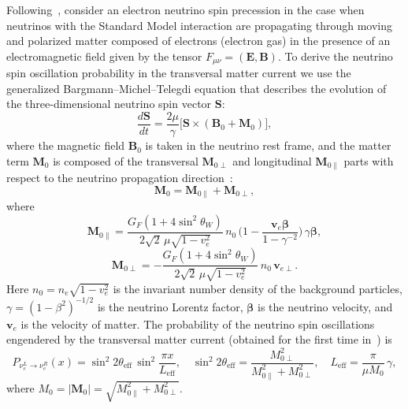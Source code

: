 \documentclass[a4paper,11pt]{article}
\begin{document}
Following~\cite{Studenikin:2004PAN,Studenikin:2019arXiv}, consider an electron neutrino spin precession in the case when neutrinos with the Standard Model interaction are propagating through moving and polarized matter composed of electrons (electron gas) in the presence of an electromagnetic field given by the tensor $F_{\mu\nu} = (\mathbf{E}, \mathbf{B})$. To derive the neutrino spin oscillation probability in the transversal matter current we use the generalized Bargmann--Michel--Telegdi equation that describes the evolution of the three-dimensional neutrino spin vector $\mathbf{S}$:
\begin{equation}
\label{eq:BMT}
\frac{d\mathbf{S}}{dt} = \frac{2\mu}{\gamma}\Big[\mathbf{S} \times (\mathbf{B}_0 + \mathbf{M}_0)\Big],
\end{equation}
where the magnetic field $\mathbf{B}_0$ is taken in the neutrino rest frame, and the matter term $\mathbf{M}_0$ is composed of the transversal $\mathbf{M}_{0\perp}$ and longitudinal $\mathbf{M}_{0\parallel}$ parts with respect to the neutrino propagation direction~\cite{Studenikin:2004PAN,Studenikin:2019arXiv}:
\begin{equation}
\label{eq:M0}
\mathbf{M}_0 = \mathbf{M}_{0\parallel} + \mathbf{M}_{0\perp},
\end{equation}
where
\begin{equation}
\label{eq:M0_par}
\mathbf{M}_{0\parallel} = \frac{G_F(1 + 4\sin^2\theta_W)}{2\sqrt{2}\,\mu\sqrt{1-v_e^2}}\,n_0\,\Big(1 - \frac{\mathbf{v}_e\boldsymbol{\beta}}{1-\gamma^{-2}}\Big)\,\gamma\boldsymbol{\beta},
\end{equation}
\begin{equation}
\label{eq:M0_perp}
\mathbf{M}_{0\perp} = -\frac{G_F(1 + 4\sin^2\theta_W)}{2\sqrt{2}\,\mu\sqrt{1-v_e^2}}\,n_0\,\mathbf{v}_{e\perp}.
\end{equation}
Here $n_0 = n_e\sqrt{1-v_e^2}$ is the invariant number density of the background particles, $\gamma = (1-\beta^2)^{-1/2}$ is the neutrino Lorentz factor, $\boldsymbol{\beta}$ is the neutrino velocity, and $\mathbf{v}_e$ is the velocity of matter. The probability of the neutrino spin oscillations engendered by the transversal matter current (obtained for the first time in~\cite{Studenikin:2004PAN}) is
\begin{equation}
\label{eq:P_spin_j}
P_{\nu_e^L \to \nu_e^R}(x) = \sin^2 2\theta_{\text{eff}}\,\sin^2\frac{\pi x}{L_{\text{eff}}}, \quad \sin^2 2\theta_{\text{eff}} = \frac{M_{0\perp}^2}{M_{0\parallel}^2 + M_{0\perp}^2}, \quad L_{\text{eff}} = \frac{\pi}{\mu M_0}\,\gamma,
\end{equation}
where $M_0 = |\mathbf{M}_0| = \sqrt{M_{0\parallel}^2 + M_{0\perp}^2}$.
\end{document}
